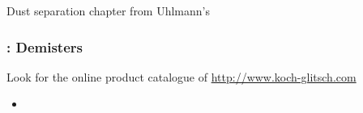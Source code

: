 Dust separation chapter from Uhlmann's 


\begin{frame}\frametitle{{\color{myGreen}{Quick}}: Demisters}
	Look for the online product catalogue of \href{http://www.koch-glitsch.com}{http://www.koch-glitsch.com}
	
	\begin{itemize}
		\item	
	\end{itemize}
\end{frame}